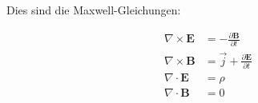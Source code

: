 \documentclass[fleqn]{scrartcl}
\begin{document}
Dies sind die Maxwell-Gleichungen:
\begin{spreadlines}{\baselineskip}
\begin{align}
	\nabla \times \pmb{E} &= -\frac{\partial  \pmb{B}}{\partial t} \\
	\nabla \times \pmb{B} &= \vec{j} + \frac{\partial  \pmb{E}}{\partial t} \\
	\nabla \cdot \pmb{E} &= \rho \\
	\nabla \cdot \pmb{B} &= 0 
\end{align}
\end{spreadlines}
\end{document}
